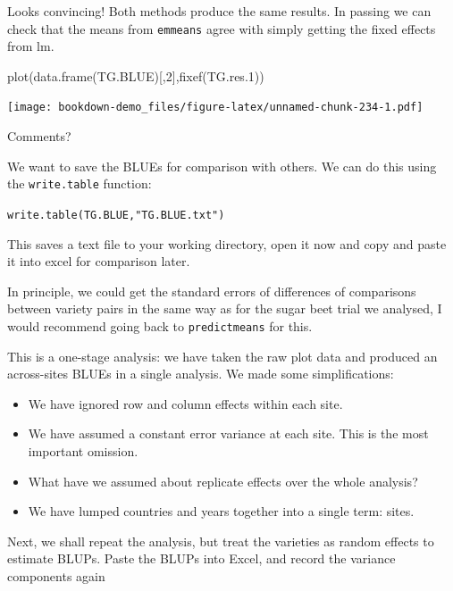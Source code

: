\documentclass[
]{book}
\newenvironment{Shaded}{\begin{snugshade}}{\end{snugshade}}
\newcommand{\DecValTok}[1]{\textcolor[rgb]{0.00,0.00,0.81}{#1}}
\newcommand{\FloatTok}[1]{\textcolor[rgb]{0.00,0.00,0.81}{#1}}
\newcommand{\FunctionTok}[1]{\textcolor[rgb]{0.00,0.00,0.00}{#1}}
\newcommand{\NormalTok}[1]{#1}
\begin{document}
Looks convincing! Both methods produce the same results. In passing we can check that the means from \texttt{emmeans} agree with simply getting the fixed effects from lm.

\begin{Shaded}
\begin{Highlighting}[]
\FunctionTok{plot}\NormalTok{(}\FunctionTok{data.frame}\NormalTok{(TG.BLUE)[,}\DecValTok{2}\NormalTok{],}\FunctionTok{fixef}\NormalTok{(TG.res}\FloatTok{.1}\NormalTok{))}
\end{Highlighting}
\end{Shaded}

\texttt{[image: bookdown-demo\_files/figure-latex/unnamed-chunk-234-1.pdf]}

Comments?

We want to save the BLUEs for comparison with others. We can do this using the \texttt{write.table} function:

\texttt{write.table(TG.BLUE,"TG.BLUE.txt")}

This saves a text file to your working directory, open it now and copy and paste it into excel for comparison later.

In principle, we could get the standard errors of differences of comparisons between variety pairs in the same way as for the sugar beet trial we analysed, I would recommend going back to \texttt{predictmeans} for this.

This is a one-stage analysis: we have taken the raw plot data and produced an across-sites BLUEs in a single analysis. We made some simplifications:

\begin{itemize}
\item
  We have ignored row and column effects within each site.
\item
  We have assumed a constant error variance at each site. This is the most important omission.
\item
  What have we assumed about replicate effects over the whole analysis?
\item
  We have lumped countries and years together into a single term: sites.
\end{itemize}

Next, we shall repeat the analysis, but treat the varieties as random effects to estimate BLUPs. Paste the BLUPs into Excel, and record the variance components again
\end{document}
